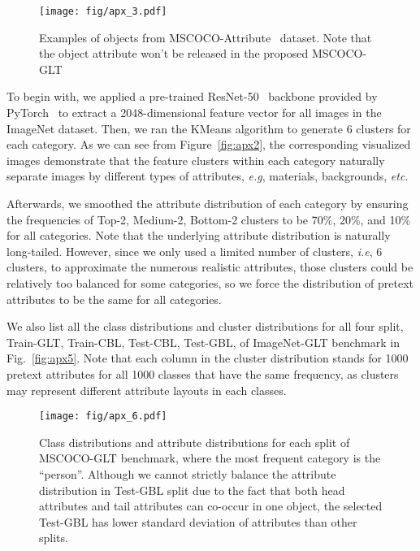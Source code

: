 \documentclass{article}
\def\eg{\emph{e.g}} \def\Eg{\emph{E.g}}
\def\ie{\emph{i.e}} \def\Ie{\emph{I.e}}
\def\etc{\emph{etc}} \def\vs{\emph{vs}}
\begin{document}
\begin{figure}
   \begin{minipage}[b]{1.0\linewidth}
   \centerline{\texttt{[image: fig/apx\_3.pdf]}}
   \end{minipage}
   \caption{Examples of objects from MSCOCO-Attribute~\cite{patterson2016coco} dataset. Note that the object attribute won't be released in the proposed MSCOCO-GLT}
   \label{fig:axp3} \end{figure}


To begin with, we applied a pre-trained ResNet-50~\cite{he2016deep} backbone provided by PyTorch~\cite{NEURIPS2019_9015} to extract a 2048-dimensional feature vector for all images in the ImageNet dataset. Then, we ran the KMeans algorithm to generate 6 clusters for each category. As we can see from Figure~\ref{fig:apx2}, the corresponding visualized images demonstrate that the feature clusters within each category naturally separate images by different types of attributes, \eg, materials, backgrounds, \etc.

Afterwards, we smoothed the attribute distribution of each category by ensuring the frequencies of Top-2, Medium-2, Bottom-2 clusters to be 70\%, 20\%, and 10\% for all categories. Note that the underlying attribute distribution is naturally long-tailed. However, since we only used a limited number of clusters, \ie, 6 clusters, to approximate the numerous realistic attributes, those clusters could be relatively too balanced for some categories, so we force the distribution of pretext attributes to be the same for all categories. 






We also list all the class distributions and cluster distributions for all four split, Train-GLT, Train-CBL, Test-CBL, Test-GBL, of ImageNet-GLT benchmark in Fig.~\ref{fig:apx5}. Note that each column in the cluster distribution stands for 1000 pretext attributes for all 1000 classes that have the same frequency, as clusters may represent different attribute layouts in each classes.






\begin{figure}
   \begin{minipage}[b]{1.0\linewidth}
   \centerline{\texttt{[image: fig/apx\_6.pdf]}}
   \end{minipage}
   \caption{Class distributions and attribute distributions for each split of MSCOCO-GLT benchmark, where the most frequent category is the ``person''. Although we cannot strictly balance the attribute distribution in Test-GBL split due to the fact that both head attributes and tail attributes can co-occur in one object, the selected Test-GBL has lower standard deviation of attributes than other splits.}
   \label{fig:apx6} \end{figure}
\end{document}
